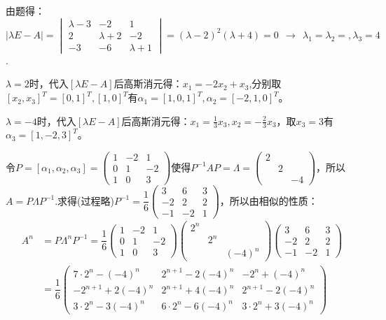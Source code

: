 \documentclass[a4paper]{report}
\begin{document}
\begin{jie}
由题得：$|\lambda E-A|=
\begin{vmatrix}
\lambda-3&-2&1\\
2&\lambda+2&-2\\
-3&-6&\lambda+1
\end{vmatrix}=(\lambda-2)^{2}(\lambda+4)=0~~\rightarrow~~\lambda_1=\lambda_2=,\lambda_3=4
$.

$\lambda=2$时，代入$[\lambda E-A]$后高斯消元得：$x_1=-2x_2+x_3$,分别取$[x_2,x_3]^T=[0,1]^T,[1,0]^T$有$
\alpha_1=[1,0,1]^T,\alpha_2=[-2,1,0]^T
$。

$\lambda=-4$时，代入$[\lambda E-A]$后高斯消元得：$x_1=\frac{1}{3}x_3,x_2=-\frac{2}{3}x_3$，取$x_3=3$有$\alpha_3=[1,-2,3]^T$。

令$P=[\alpha_1,\alpha_2,\alpha_3]=
\begin{pmatrix}
1&-2&1\\
0&1&-2\\
1&0&3
\end{pmatrix}
$使得$P^{-1}AP=\Lambda=
\begin{pmatrix}
2\\&2\\&&-4
\end{pmatrix}
$，所以$A=P\Lambda P^{-1}$.求得(过程略)$P^{-1}=\dfrac{1}{6}
\begin{pmatrix}
3&6&3\\
-2&2&2\\
-1&-2&1
\end{pmatrix}
$，所以由相似的性质：
\begin{align*}
A^n&=P\Lambda^nP^{-1}=
\dfrac{1}{6}\begin{pmatrix}
1&-2&1\\
0&1&-2\\
1&0&3
\end{pmatrix}\begin{pmatrix}
2^n\\&2^n\\&&(-4)^n
\end{pmatrix}\begin{pmatrix}
3&6&3\\
-2&2&2\\
-1&-2&1
\end{pmatrix}\\&=
\dfrac{1}{6}
\begin{pmatrix}
7\cdot 2^{n}-(-4)^{n}&2^{n+1}-2(-4)^{n}&-2^{n}+(-4)^{n}\\
-2^{n+1}+2(-4)^{n}&2^{n+1}+4(-4)^{n}&2^{n+1}-2(-4)^{n}\\
3\cdot 2^{n}-3(-4)^{n}&6\cdot2^{n}-6(-4)^{n}&3\cdot2^{n}+3(-4)^{n}
\end{pmatrix}
\end{align*}
\end{jie}
\end{document}
